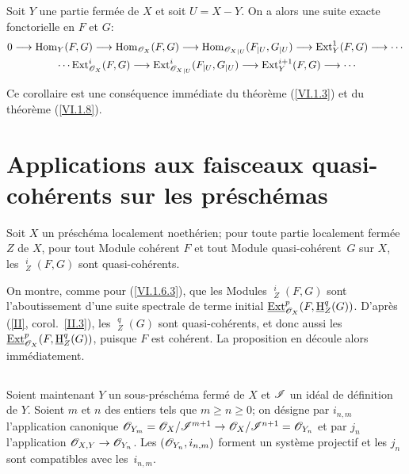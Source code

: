 \begin{corollaire} \label{VI.1.9} Soit $Y$ une partie ferm\'ee de $X$ et soit $U=X{-} Y$. On a alors une suite exacte fonctorielle en $F$ et $G$:
\begin{gather*}
0 \to \Hom_Y(F, G) \to \Hom_{\OX}(F, G) \to \Hom_{{\OX}_{|U}}(F_{|U}, G_{|U}) \to \Ext_{Y}^1(F, G) \to \cdots{}\\
{}\cdots \Ext_{{\OX}}^i(F, G) \to \Ext_{{{\OX}_{|U}}}^i(F_{|U}, G_{|U}) \to \Ext_{Y}^{i+1}(F, G) \to \cdots
\end{gather*}
\end{corollaire}

Ce corollaire est une cons\'equence imm\'ediate du th\'eor\`eme (\ref{VI.1.3}) et du th\'eor\`eme (\ref{VI.1.8}).

\section{Applications aux faisceaux quasi-coh\'erents sur les pr\'esch\'emas} \label{VI.2}

\begin{proposition} \label{VI.2.1}
Soit $X$ un pr\'esch\'ema localement noeth\'erien; pour toute partie localement ferm\'ee $Z$ de $X$, pour tout Module coh\'erent $F$ et tout Module quasi-coh\'erent~$G$ sur $X$, les $\mathop{\underline{\mathrm{Ext}}}\nolimits_Z^i(F, G)$ sont quasi-coh\'erents.
\end{proposition}

On montre, comme pour (\ref{VI.1.6.3}), que les Modules $\mathop{\underline{\mathrm{Ext}}}\nolimits_Z^i(F, G)$ sont l'aboutissement d'une suite spectrale de terme initial $\mathop{\underline{\mathrm{Ext}}}\nolimits_{\mathscr{O}_X}^p(F, \mathop{\underline{\mathrm{H}}}\nolimits_Z^q (G))$. D'apr\`es (\ref{II}, corol.\, \ref{II.3}), les $\mathop{\underline{\mathrm{H}}}\nolimits_Z^q(G)$ sont quasi-coh\'erents, et donc aussi les $\mathop{\underline{\mathrm{Ext}}}\nolimits_{\mathscr{O}_X}^p (F, \mathop{\underline{\mathrm{H}}}\nolimits_Z^q (G))$, puisque $F$ est coh\'erent. La proposition en d\'ecoule alors imm\'ediatement.

\begin{empty} \label{VI.2.2}
\end{empty}

\subsection{} Soient maintenant $Y$ un sous-pr\'esch\'ema ferm\'e de $X$ et $\mathscr I$ un id\'eal de d\'efinition de $Y$. Soient $m$ et $n$ des entiers tels que $m\geq n \geq 0$; on d\'esigne par $i_{n, m}$ l'application canonique $\Oo_{Y_m} = \OX/\SheafI^{m+1} \to \OX/\SheafI^{n+1} = \Oo_{Y_n}$ et par $j_n$ l'application \hbox{$\Oo_{X, Y}\to \Oo_{Y_n}$}. Les $({\mathscr O}_{Y_n}, i_{n, m})$ forment un syst\`eme projectif et les $j_n$ sont compatibles avec les~$i_{n, m}$.

